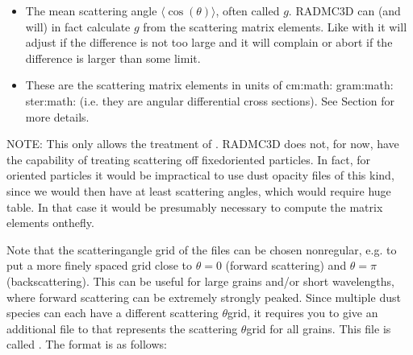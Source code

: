 \documentclass[letterpaper,10pt,english]{sphinxmanual}
\begin{document}
\begin{itemize}
\item {} 
 The mean scattering angle
\(\langle\cos(\theta)\rangle\), often called \(g\). RADMC\sphinxhyphen{}3D can (and will) in
fact calculate \(g\) from the scattering matrix elements. Like with
 it will adjust if the difference is not
too large and it will complain or abort if the difference is larger than
some limit.

\item {} 
 These are the scattering matrix elements
in units of cm:math: gram:math: ster:math: (i.e. they are angular
differential cross sections). See Section {\hyperref[\detokenize{dustradtrans:sec-scattering}]{}} for
more details.

\end{itemize}

NOTE: This only allows the treatment of . RADMC\sphinxhyphen{}3D
does not, for now, have the capability of treating scattering off fixed\sphinxhyphen{}oriented
particles. In fact, for oriented particles it would be impractical to
use dust opacity files of this kind, since we would then have at least 
scattering angles, which would require huge table. In that case it would be
presumably necessary to compute the matrix elements on\sphinxhyphen{}the\sphinxhyphen{}fly.

Note that the scattering\sphinxhyphen{}angle grid of the  files can
be chosen non\sphinxhyphen{}regular, e.g. to put a more finely spaced grid close to
\(\theta=0\) (forward scattering) and \(\theta=\pi\) (backscattering).
This can be useful for large grains and/or short wavelengths, where forward
scattering can be extremely strongly peaked. Since multiple dust species can
each have a different scattering \(\theta\)\sphinxhyphen{}grid, it requires you to give an
additional file to  that represents the scattering
\(\theta\)\sphinxhyphen{}grid for all grains. This file is called
. The format is as follows:
\end{document}
